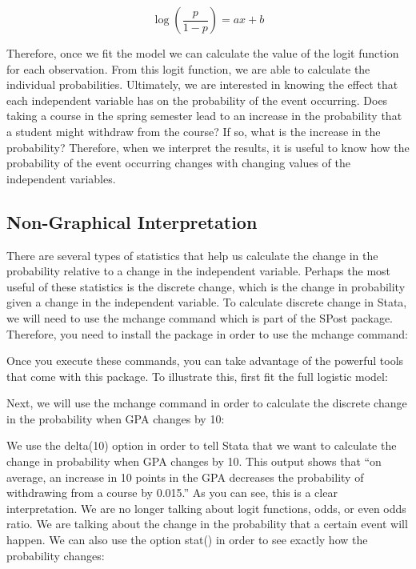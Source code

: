 \documentclass[a4paper,12pt,oneside]{book}
\begin{document}
$$ \log(\frac{p}{1-p})=ax+b $$

Therefore, once we fit the model we can calculate the value of the logit function for each observation. From this logit function, we are able to calculate the individual probabilities. Ultimately, we are interested 
in knowing the effect that each independent variable has on the probability of the event occurring. Does taking a course in the spring semester lead to an increase in the probability that a student might 
withdraw from the course? If so, what is the increase in the probability? Therefore, when we interpret the results, it is useful to know how the probability of the event occurring changes with changing values of the 
independent variables.
\subsection{Non-Graphical Interpretation}
There are several types of statistics that help us calculate the change in the probability relative to a change in the independent variable. Perhaps the most useful of these statistics is the discrete change, 
which is the change in probability given a change in the independent variable. To calculate discrete change in Stata, we will need to use the mchange command which is part of the SPost package. 
Therefore, you need to install the package in order to use the mchange command:

\begin{stlog}\end{stlog}

Once you execute these commands, you can take advantage of the powerful tools that come with this package. To illustrate this, first fit the full logistic model:

\begin{stlog}\end{stlog}

Next, we will use the mchange command in order to calculate the discrete change in the probability when GPA changes by 10:

\begin{stlog}\end{stlog}

We use the delta(10) option in order to tell Stata that we want to calculate the change in probability when GPA changes by 10. This output shows that “on average, an increase in 10 points in the GPA decreases 
the probability of withdrawing from a course by 0.015.” As you can see, this is a clear interpretation. We are no longer talking about logit functions, odds, or even odds ratio. We are talking about the change 
in the probability that a certain event will happen. We can also use the option stat() in order to see exactly how the probability changes:
\end{document}
